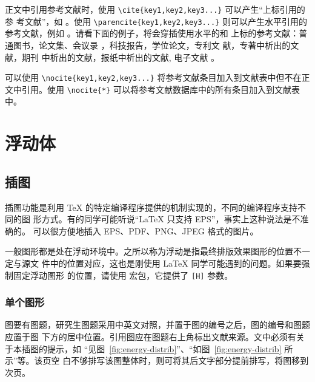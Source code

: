 \documentclass{sjtureport}
\begin{document}
正文中引用参考文献时，使用 \verb|\cite{key1,key2,key3...}| 可以产生“上标引用的参
考文献”，如 \cite{Yu2001,Cheng1999,LSC1957}。使用
\verb|\parencite{key1,key2,key3...}| 则可以产生水平引用的参考文献，例如
\parencite{Li1999,Jiang1989,Hopkinson1999}。请看下面的例子，将会穿插使用水平的和
上标的参考文献：普通图书\parencite{Yu2001,Jiang1998}，论文集、会议录
\cite{CSTAM1990}，科技报告\parencite{WHO1970}，学位论文\cite{Zhang1998}，专利文
献\parencite{Jiang1989,HBLZ2001}，专著中析出的文献\cite{Cheng1999,GBT2659}，期刊
中析出的文献\parencite{Li1999,Li2000}，报纸中析出的文献\cite{Ding2000}, 电子文献
\parencite{Jiang1999,Christine1998,Xiao2001}。

可以使用 \verb|\nocite{key1,key2,key3...}| 将参考文献条目加入到文献表中但不在正
文中引用。使用 \verb|\nocite{*}| 可以将参考文献数据库中的所有条目加入到文献表
中。
\nocite{Yang1999,Schinstock2000,Wen1990,GBT16159}


\chapter{浮动体}

\section{插图}

插图功能是利用 \TeX{} 的特定编译程序提供的机制实现的，不同的编译程序支持不同的图
形方式。有的同学可能听说“\LaTeX{} 只支持 EPS”，事实上这种说法是不准确的。\XeTeX{}
可以很方便地插入 EPS、PDF、PNG、JPEG 格式的图片。

一般图形都是处在浮动环境中。之所以称为浮动是指最终排版效果图形的位置不一定与源文
件中的位置对应，这也是刚使用 \LaTeX{} 同学可能遇到的问题。如果要强制固定浮动图形
的位置，请使用  宏包，它提供了 \texttt{[H]} 参数。

\subsection{单个图形}

图要有图题，研究生图题采用中英文对照，并置于图的编号之后，图的编号和图题应置于图
下方的居中位置。引用图应在图题右上角标出文献来源。文中必须有关于本插图的提示，如
“见图~\ref{fig:energy-distrib}”、“如图~\ref{fig:energy-distrib} 所示”等。该页空
白不够排写该图整体时，则可将其后文字部分提前排写，将图移到次页。
\end{document}
